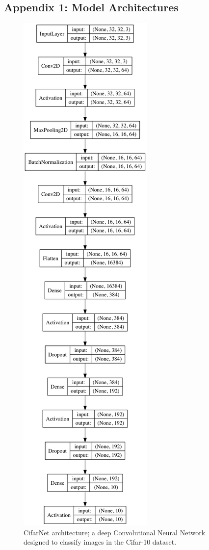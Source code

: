 \documentclass[letterpaper, 10 pt, conference]{ieeeconf}  %
\begin{document}
\subsection{Appendix 1: Model Architectures}
\begin{figure}[H]
      \centering
      \includegraphics[scale = .3]{cifarnet_model.png}
		\centering
      \caption{CifarNet architecture; a deep Convolutional Neural Network designed to classify images in the Cifar-10 dataset.}
      \label{figurelabel}
\end{figure}
    
\end{document}
